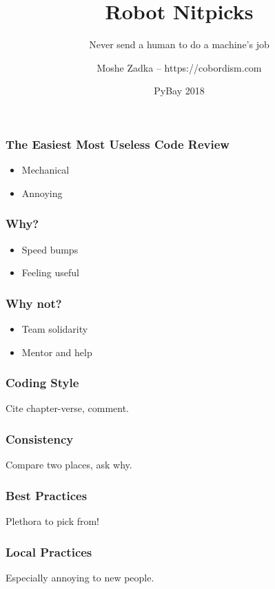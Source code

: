 \usepackage[utf8]{inputenc}
\usepackage{listings}
\usepackage{textcomp}

\title{Robot Nitpicks}
\subtitle{Never send a human to do a machine's job}
\author{Moshe Zadka -- https://cobordism.com}
\date{PyBay 2018}
 

 
\begin{titlepage}
\maketitle
\end{titlepage}

\frame{\titlepage}

\begin{frame}
\frametitle{The Easiest Most Useless Code Review}
\begin{itemize}
\item Mechanical
\item Annoying
\end{itemize}
\end{frame}

\begin{frame}
\frametitle{Why?}
\begin{itemize}
\item Speed bumps
\item Feeling useful
\end{itemize}
\end{frame}

\begin{frame}
\frametitle{Why not?}
\begin{itemize}
\item Team solidarity
\item Mentor and help
\end{itemize}
\end{frame}

\begin{frame}
\frametitle{Coding Style}
Cite chapter-verse,
comment.
\end{frame}

\begin{frame}
\frametitle{Consistency}
Compare two places,
ask why.
\end{frame}

\begin{frame}
\frametitle{Best Practices}
Plethora to pick from!
\end{frame}

\begin{frame}
\frametitle{Local Practices}
Especially annoying to new people.
\end{frame}

